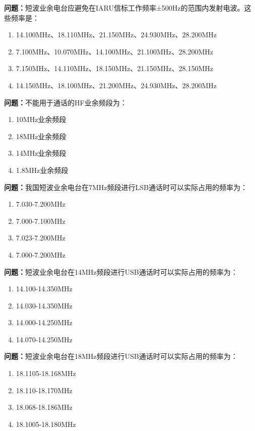 \bigskip


\noindent\textbf{问题：}短波业余电台应避免在IARU信标工作频率±500Hz的范围内发射电波。这些频率是：
\begin{enumerate}[label=\Alph*), leftmargin=3em]
\item 14.100MHz、18.110MHz、21.150MHz、24.930MHz、28.200MHz
\item 7.100MHz、10.070MHz、14.100MHz、21.100MHz、28.200MHz
\item 7.150MHz、14.110MHz、18.150MHz、21.150MHz、28.150MHz
\item 14.150MHz、18.100MHz、21.200MHz、24.930MHz、28.200MHz
\end{enumerate}

\bigskip


\noindent\textbf{问题：}不能用于通话的HF业余频段为：
\begin{enumerate}[label=\Alph*), leftmargin=3em]
\item 10MHz业余频段
\item 18MHz业余频段
\item 14MHz业余频段
\item 1.8MHz业余频段
\end{enumerate}

\bigskip


\noindent\textbf{问题：}我国短波业余电台在7MHz频段进行LSB通话时可以实际占用的频率为：
\begin{enumerate}[label=\Alph*), leftmargin=3em]
\item 7.030-7.200MHz
\item 7.000-7.100MHz
\item 7.023-7.200MHz
\item 7.000-7.200MHz
\end{enumerate}

\bigskip


\noindent\textbf{问题：}短波业余电台在14MHz频段进行USB通话时可以实际占用的频率为：
\begin{enumerate}[label=\Alph*), leftmargin=3em]
\item 14.100-14.350MHz
\item 14.030-14.350MHz
\item 14.000-14.250MHz
\item 14.070-14.250MHz
\end{enumerate}

\bigskip


\noindent\textbf{问题：}短波业余电台在18MHz频段进行USB通话时可以实际占用的频率为：
\begin{enumerate}[label=\Alph*), leftmargin=3em]
\item 18.1105-18.168MHz
\item 18.110-18.170MHz
\item 18.068-18.186MHz
\item 18.1005-18.180MHz
\end{enumerate}

